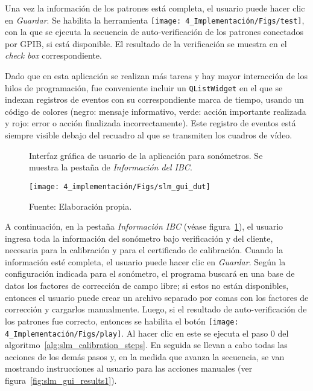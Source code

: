 Una vez la información de los patrones está completa, el usuario puede hacer clic en \emph{Guardar}.
Se habilita la herramienta \texttt{[image: 4\_Implementación/Figs/test]}, con la que se ejecuta la secuencia de auto-verificación de los patrones conectados por GPIB, si está disponible.
El resultado de la verificación se muestra en el \emph{check box} correspondiente.

Dado que en esta aplicación se realizan más tareas y hay mayor interacción de los hilos de programación, fue conveniente incluir un {\footnotesize \texttt{QListWidget}} en el que se indexan registros de eventos con su correspondiente marca de tiempo, usando un código de colores (negro: mensaje informativo, verde: acción importante realizada y rojo: error o acción finalizada incorrectamente).
Este registro de eventos está siempre visible debajo del recuadro al que se transmiten los cuadros de vídeo.

\begin{figure}[!h]
    \centering
    \caption{Interfaz gráfica de usuario de la aplicación para sonómetros. Se muestra la pestaña de \emph{Información del IBC}.}
    \label{fig:slm_gui_dut}
    \texttt{[image: 4\_implementación/Figs/slm\_gui\_dut]}
    \caption*{\footnotesize Fuente: Elaboración propia.}
\end{figure}

A continuación, en la pestaña \emph{Información IBC} (véase figura~\ref{fig:slm_gui_dut}), el usuario ingresa toda la información del sonómetro bajo verificación y del cliente, necesaria para la calibración y para el certificado de calibración.
Cuando la información esté completa, el usuario puede hacer clic en \emph{Guardar}.
Según la configuración indicada para el sonómetro, el programa buscará en una base de datos los factores de corrección de campo libre;
si estos no están disponibles, entonces el usuario puede crear un archivo separado por comas con los factores de corrección y cargarlos manualmente.
Luego, si el resultado de auto-verificación de los patrones fue correcto, entonces se habilita el botón \texttt{[image: 4\_Implementación/Figs/play]}.
Al hacer clic en este se ejecuta el paso $0$ del algoritmo~\ref{alg:slm_calibration_steps}.
En seguida se llevan a cabo todas las acciones de los demás pasos y, en la medida que avanza la secuencia, se van mostrando instrucciones al usuario para las acciones manuales (ver figura~\ref{fig:slm_gui_results1}).

\vfill
\clearpage

